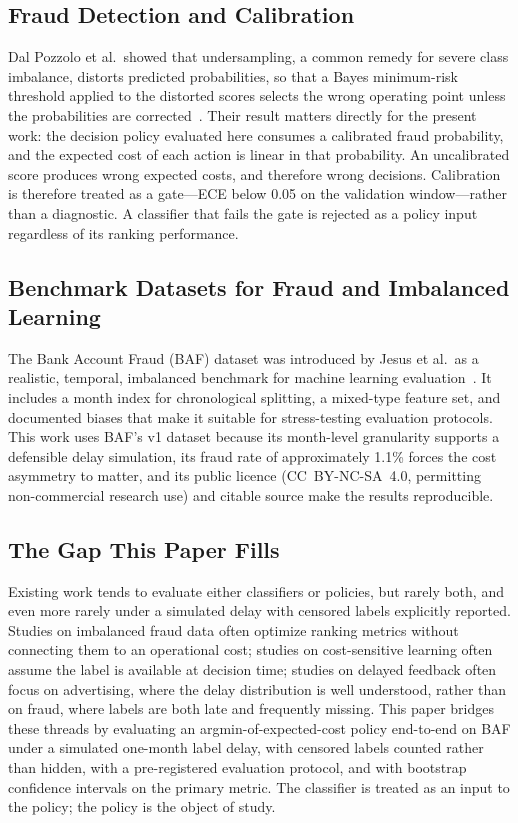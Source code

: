 \documentclass[conference]{IEEEtran}
\begin{document}
\subsection{Fraud Detection and Calibration}

Dal Pozzolo et al.\ showed that undersampling, a common remedy for severe
class imbalance, distorts predicted probabilities, so that a Bayes
minimum-risk threshold applied to the distorted scores selects the wrong
operating point unless the probabilities are corrected~\cite{dalpozzolo2015}. Their result
matters directly for the present work: the decision policy evaluated here
consumes a calibrated fraud probability, and the expected cost of each
action is linear in that probability. An uncalibrated score produces wrong
expected costs, and therefore wrong decisions. Calibration is therefore
treated as a gate---ECE below 0.05 on the validation window---rather than a
diagnostic. A classifier that fails the gate is rejected as a policy input
regardless of its ranking performance.

\subsection{Benchmark Datasets for Fraud and Imbalanced Learning}

The Bank Account Fraud (BAF) dataset was introduced by Jesus et al.\ as a
realistic, temporal, imbalanced benchmark for machine learning
evaluation~\cite{jesus2022}. It includes a month index for chronological
splitting, a mixed-type feature set, and documented biases that make it
suitable for stress-testing evaluation protocols. This work uses BAF's v1
dataset because its month-level granularity supports a defensible delay
simulation, its fraud rate of approximately 1.1\% forces the cost asymmetry
to matter, and its public licence (CC~BY-NC-SA~4.0, permitting
non-commercial research use) and citable source make the results
reproducible.

\subsection{The Gap This Paper Fills}

Existing work tends to evaluate either classifiers or policies, but rarely
both, and even more rarely under a simulated delay with censored labels
explicitly reported. Studies on imbalanced fraud data often optimize
ranking metrics without connecting them to an operational cost; studies on
cost-sensitive learning often assume the label is available at decision
time; studies on delayed feedback often focus on advertising, where the
delay distribution is well understood, rather than on fraud, where labels
are both late and frequently missing. This paper bridges these threads by
evaluating an argmin-of-expected-cost policy end-to-end on BAF under a
simulated one-month label delay, with censored labels counted rather than
hidden, with a pre-registered evaluation protocol, and with bootstrap
confidence intervals on the primary metric. The classifier is treated as an
input to the policy; the policy is the object of study.
\end{document}
